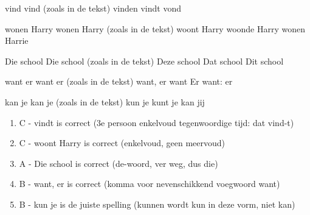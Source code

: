 \begin{opgave}
\begin{vragen}
%
{vind}%
{vind (zoals in de tekst)}%
{vinden}%
{vindt}%
{vond}

%
{wonen Harry}%
{wonen Harry (zoals in de tekst)}%
{woont Harry}%
{woonde Harry}%
{wonen Harrie}

%
{Die school}%
{Die school (zoals in de tekst)}%
{Deze school}%
{Dat school}%
{Dit school}

%
{want er}%
{want er (zoals in de tekst)}%
{want, er}%
{want Er}%
{want: er}

%
{kan je}%
{kan je (zoals in de tekst)}%
{kun je}%
{kunt je}%
{kan jij}

\end{vragen}

\end{opgave}

\begin{oplossing}
\begin{enumerate}
\item C - vindt is correct (3e persoon enkelvoud tegenwoordige tijd: dat
vind-t)
\item C - woont Harry is correct (enkelvoud, geen meervoud)
\item A - Die school is correct (de-woord, ver weg, dus die)
\item B - want, er is correct (komma voor nevenschikkend voegwoord want)
\item B - kun je is de juiste spelling (kunnen wordt kun in deze vorm, niet
kan)
\end{enumerate}
\end{oplossing}
